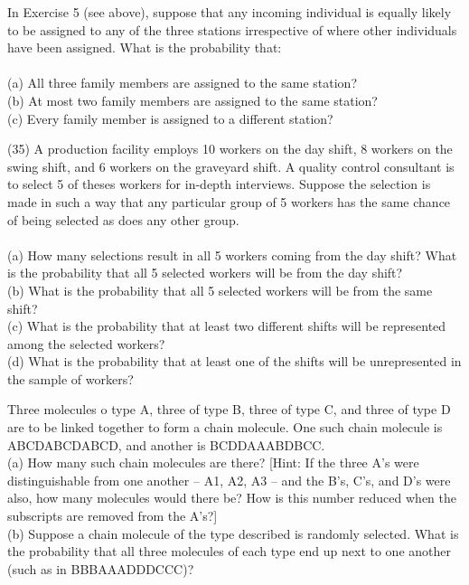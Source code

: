 \documentclass[12pt,letterpaper]{hmcpset}
\begin{document}
\begin{problem}[2.2.28]
In Exercise 5 (see above), suppose that any incoming individual is equally likely to be assigned to any of the three stations irrespective of where other individuals have been assigned. What is the probability that:
\\ \\
(a) All three family members are assigned to the same station?
\\
(b) At most two family members are assigned to the same station?
\\
(c) Every family member is assigned to a different station?

\end{problem}

\begin{solution}

\end{solution}
\newpage
\begin{problem}[2.3.35]
(35) A production facility employs 10 workers on the day shift, 8 workers on the swing shift, and 6 workers on the graveyard shift. A quality control consultant is to select 5 of theses workers for in-depth interviews. Suppose the selection is made in such a way that any particular group of 5 workers has the same chance of being selected as does any other group.
\\ \\
(a) How many selections result in all 5 workers coming from the day shift? What is the probability that all 5 selected workers will be from the day shift?
\\
(b) What is the probability that all 5 selected workers will be from the same shift?
\\
(c) What is the probability that at least two different shifts will be represented among the selected workers?
\\
(d) What is the probability that at least one of the shifts will be unrepresented in the sample of workers?

\end{problem}

\begin{solution}

\end{solution}
\newpage
\begin{problem}[2.3.40]
Three molecules o type A, three of type B, three of type C, and three of type D are to be linked together to form a chain molecule. One such chain molecule is ABCDABCDABCD, and another is BCDDAAABDBCC.
\\
(a) How many such chain molecules are there? [Hint: If the three A’s were distinguishable from one another – A1, A2, A3 – and the B’s, C’s, and D’s were also, how many molecules would there be? How is this number reduced when the subscripts are removed from the A’s?]
\\
(b) Suppose a chain molecule of the type described is randomly selected. What is the probability that all three molecules of each type end up next to one another (such as in BBBAAADDDCCC)?

\end{problem}
\end{document}
